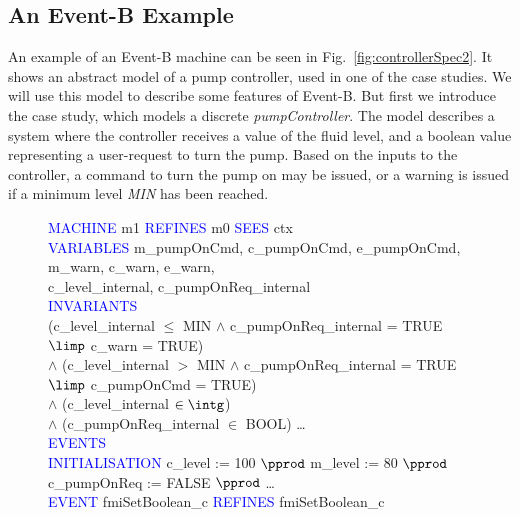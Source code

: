 \subsection{An Event-B Example}
An example of an Event-B machine can be seen in Fig.~\ref{fig:controllerSpec2}. It shows an abstract model of a pump controller, used in one of the case studies. We will use this model to describe some features of Event-B. But first we introduce the case study, which models a discrete \emph{pumpController}. The model describes a system where the controller receives a value of the fluid level, and a boolean value representing a user-request to turn the pump. Based on the inputs to the controller, a command to turn the pump on may be issued, or a warning is issued if a minimum level \emph{MIN} has been reached.    
%
%
%
\begin{figure}[h]
\centering
\begin{minipage}{0.8\textwidth}
\textcolor{blue}{MACHINE} m1 \textcolor{blue}{REFINES} m0 \textcolor{blue}{SEES} ctx \\
\textcolor{blue}{VARIABLES}  \hspace*{0.2cm} m\_pumpOnCmd, c\_pumpOnCmd, e\_pumpOnCmd, m\_warn, c\_warn, e\_warn,\\
\hspace*{0.2cm} c\_level\_internal, c\_pumpOnReq\_internal\\
\textcolor{blue}{INVARIANTS}\\
\hspace*{0.2cm}(c\_level\_internal $\leq$ MIN $\land$  c\_pumpOnReq\_internal = TRUE $\limp$  c\_warn = TRUE)\\
\hspace*{0.2cm} $\land$ (c\_level\_internal $>$  MIN $\land$  c\_pumpOnReq\_internal = TRUE\\
\hspace*{0.5cm} $\limp$  c\_pumpOnCmd = TRUE)\\
\hspace*{0.2cm} $\land$ (c\_level\_internal $\in  \intg$)\\
\hspace*{0.2cm} $\land$ (c\_pumpOnReq\_internal $\in$  BOOL) \ldots\\
\textcolor{blue}{EVENTS}\\
\textcolor{blue}{INITIALISATION} c\_level :=  100 $\pprod$ m\_level := 80 $\pprod$ c\_pumpOnReq :=  FALSE $\pprod$ \ldots\\
\textcolor{blue}{EVENT} fmiSetBoolean\_c \textcolor{blue}{REFINES} fmiSetBoolean\_c\\

\end{minipage}
\end{figure}
